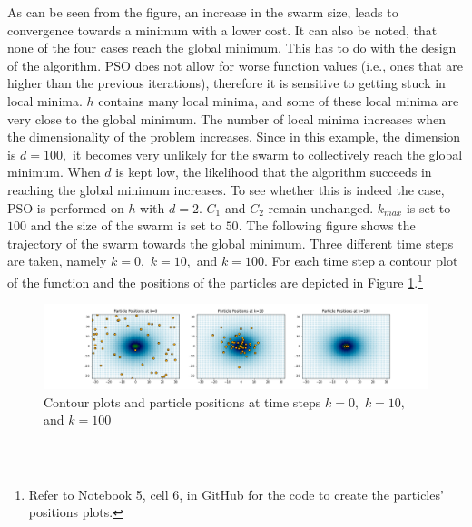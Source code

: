 As can be seen from the figure, an increase in the swarm size, leads to convergence towards a minimum with a lower cost. It can also be noted, that none of the four cases reach the global minimum. This has to do with the design of the algorithm. PSO does not allow for worse function values (i.e., ones that are higher than the previous iterations), therefore it is sensitive to getting stuck in local minima. $h$ contains many local minima, and some of these local minima are very close to the global minimum. The number of local minima increases when the dimensionality of the problem increases. Since in this example, the dimension is $d=100,$ it becomes very unlikely for the swarm to collectively reach the global minimum. When $d$ is kept low, the likelihood that the algorithm succeeds in reaching the global minimum increases. To see whether this is indeed the case, PSO is performed on $h$ with $d=2.$ $C_{1}$ and $C_{2}$ remain unchanged. $k_{max}$ is set to $100$ and the size of the swarm is set to $50.$ The following figure shows the trajectory of the swarm towards the global minimum. Three different time steps are taken, namely $k=0,$ $k=10,$ and $k=100.$ For each time step a contour plot of the function and the positions of the particles are depicted in Figure \ref{fig:PSO_2D_swarm}.\footnote{Refer to Notebook 5, cell 6, in GitHub \cite{ThesisCode2023} for the code to create the particles' positions plots.}
\begin{figure}[h!]
    \centering
        \includegraphics[width=1\textwidth]{Pictures/PSO_ackleys_2D_swarm.png}
    \caption{Contour plots and particle positions at time steps $k=0,$ $k=10,$ and $k=100$}\label{fig:PSO_2D_swarm}
\end{figure}\\
\newpage
